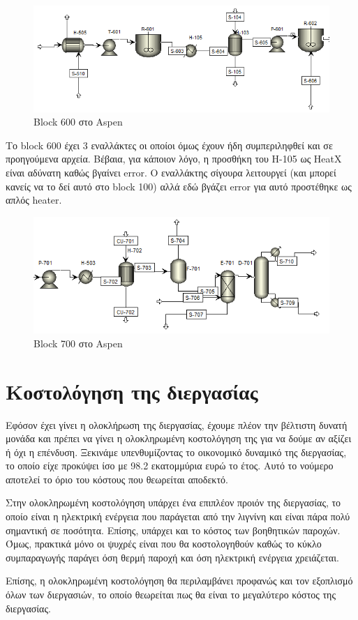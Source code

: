 \documentclass[11pt]{article}
\begin{document}
\begin{figure}[htbp]
\centering
\includegraphics[width=.9\linewidth]{Blocks_της_διεργασίας_μετά_την_ενεργειακή_ολοκλήρωση/2023-04-27_15-00-23_screenshot.png}
\caption{Block 600 στο Aspen}
\end{figure}

Το block 600 έχει 3 εναλλάκτες οι οποίοι όμως έχουν ήδη συμπεριληφθεί και σε προηγούμενα αρχεία. Βέβαια, για κάποιον λόγο, η προσθήκη του H-105 ως HeatX είναι αδύνατη καθώς βγαίνει error. Ο εναλλάκτης σίγουρα λειτουργεί (και μπορεί κανείς να το δεί αυτό στο block 100) αλλά εδώ βγάζει error για αυτό προστέθηκε ως απλός heater.

\begin{figure}[htbp]
\centering
\includegraphics[width=.9\linewidth]{Blocks_της_διεργασίας_μετά_την_ενεργειακή_ολοκλήρωση/2023-04-27_15-02-15_screenshot.png}
\caption{Block 700 στο Aspen}
\end{figure}

\pagebreak

\section{Κοστολόγηση της διεργασίας}
\label{sec:orgae252f7}
Εφόσον έχει γίνει η ολοκλήρωση της διεργασίας, έχουμε πλέον την βέλτιστη δυνατή μονάδα και πρέπει να γίνει η ολοκληρωμένη κοστολόγηση της για να δούμε αν αξίζει ή όχι η επένδυση. Ξεκινάμε υπενθυμίζοντας το οικονομικό δυναμικό της διεργασίας, το οποίο είχε προκύψει ίσο με 98.2 εκατομμύρια ευρώ το έτος. Αυτό το νούμερο αποτελεί το όριο του κόστους που θεωρείται αποδεκτό.

Στην ολοκληρωμένη κοστολόγηση υπάρχει ένα επιπλέον προιόν της διεργασίας, το οποίο είναι η ηλεκτρική ενέργεια που παράγεται από την λιγνίνη και είναι πάρα πολύ σημαντική σε ποσότητα. Επίσης, υπάρχει και το κόστος των βοηθητικών παροχών. Όμως, πρακτικά μόνο οι ψυχρές είναι που θα κοστολογηθούν καθώς το κύκλο συμπαραγωγής παράγει όση θερμή παροχή και όση ηλεκτρική ενέργεια χρειάζεται.

Επίσης, η ολοκληρωμένη κοστολόγηση θα περιλαμβάνει προφανώς και τον εξοπλισμό όλων των διεργασιών, το οποίο θεωρείται πως θα είναι το μεγαλύτερο κόστος της διεργασίας.
\end{document}
